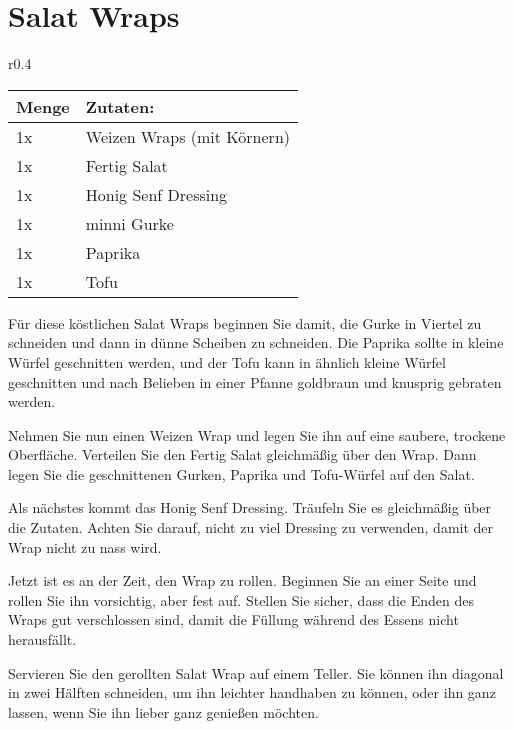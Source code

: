 \documentclass[../../book.tex]{subfiles}
\begin{document}
\section{Salat Wraps}
\begin{wraptable}{r}{0.4\textwidth}
    \centering
    \begin{tabularx}{0.39\textwidth}{|l|X|}
        \midrule
        Menge & Zutaten: \\
        \midrule
        1x & Weizen Wraps (mit Körnern) \\
        \midrule
        1x & Fertig Salat \\
        \midrule
        1x & Honig Senf Dressing \\
        \midrule
        1x & minni Gurke\\
        \midrule
        1x & Paprika\\
        \midrule
        1x & Tofu\\
        \midrule
    \end{tabularx}
\end{wraptable}

Für diese köstlichen Salat Wraps beginnen Sie damit, die Gurke in Viertel zu schneiden und dann in dünne Scheiben zu schneiden. Die Paprika sollte in kleine Würfel geschnitten werden, und der Tofu kann in ähnlich kleine Würfel geschnitten und nach Belieben in einer Pfanne goldbraun und knusprig gebraten werden.

Nehmen Sie nun einen Weizen Wrap und legen Sie ihn auf eine saubere, trockene Oberfläche. Verteilen Sie den Fertig Salat gleichmäßig über den Wrap. Dann legen Sie die geschnittenen Gurken, Paprika und Tofu-Würfel auf den Salat.

Als nächstes kommt das Honig Senf Dressing. Träufeln Sie es gleichmäßig über die Zutaten. Achten Sie darauf, nicht zu viel Dressing zu verwenden, damit der Wrap nicht zu nass wird.

Jetzt ist es an der Zeit, den Wrap zu rollen. Beginnen Sie an einer Seite und rollen Sie ihn vorsichtig, aber fest auf. Stellen Sie sicher, dass die Enden des Wraps gut verschlossen sind, damit die Füllung während des Essens nicht herausfällt.

Servieren Sie den gerollten Salat Wrap auf einem Teller. Sie können ihn diagonal in zwei Hälften schneiden, um ihn leichter handhaben zu können, oder ihn ganz lassen, wenn Sie ihn lieber ganz genießen möchten.

\newpage
\end{document}
